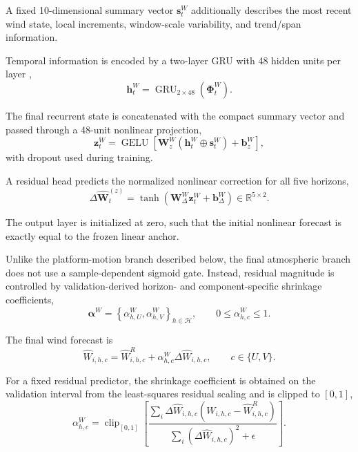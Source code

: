 A fixed 10-dimensional summary vector $\mathbf s_t^W$ additionally describes the most recent wind state, local increments, window-scale variability, and trend/span information.

Temporal information is encoded by a two-layer GRU with 48 hidden units per layer \cite{Cho2014},
\begin{equation}
\mathbf h_t^W
=
\operatorname{GRU}_{2\times48}
\left(
\boldsymbol{\Phi}_t^W
\right).
\label{eq:wind_gru}
\end{equation}

The final recurrent state is concatenated with the compact summary vector and passed through a 48-unit nonlinear projection,
\begin{equation}
\mathbf z_t^W
=
\operatorname{GELU}
\left[
\mathbf W_z^W
\left(
\mathbf h_t^W
\oplus
\mathbf s_t^W
\right)
+
\mathbf b_z^W
\right],
\label{eq:wind_fusion}
\end{equation}
with dropout used during training.

A residual head predicts the normalized nonlinear correction for all five horizons,
\begin{equation}
\Delta\hat{\mathbf W}^{(z)}_t
=
\tanh
\left(
\mathbf W_\Delta^W
\mathbf z_t^W
+
\mathbf b_\Delta^W
\right)
\in
\mathbb R^{5\times2}.
\label{eq:wind_residual_head}
\end{equation}

The output layer is initialized at zero, such that the initial nonlinear forecast is exactly equal to the frozen linear anchor.

Unlike the platform-motion branch described below, the final atmospheric branch does not use a sample-dependent sigmoid gate. Instead, residual magnitude is controlled by validation-derived horizon- and component-specific shrinkage coefficients,
\begin{equation}
\boldsymbol{\alpha}^{W}
=
\left\{
\alpha_{h,U}^{W},
\alpha_{h,V}^{W}
\right\}_{h\in\mathcal H},
\qquad
0
\leq
\alpha_{h,c}^{W}
\leq
1.
\label{eq:wind_alpha_set}
\end{equation}

The final wind forecast is
\begin{equation}
\boxed{
\hat W_{i,h,c}
=
\hat W^{R}_{i,h,c}
+
\alpha_{h,c}^{W}
\Delta\hat W_{i,h,c}
},
\qquad
c\in\{U,V\}.
\label{eq:final_wind_forecast}
\end{equation}

For a fixed residual predictor, the shrinkage coefficient is obtained on the validation interval from the least-squares residual scaling and is clipped to $[0,1]$,
\begin{equation}
\alpha_{h,c}^{W}
=
\operatorname{clip}_{[0,1]}
\left[
\frac{
\sum_i
\Delta\hat W_{i,h,c}
\left(
W_{i,h,c}
-
\hat W^R_{i,h,c}
\right)
}{
\sum_i
\left(
\Delta\hat W_{i,h,c}
\right)^2
+
\epsilon
}
\right].
\label{eq:wind_alpha}
\end{equation}

